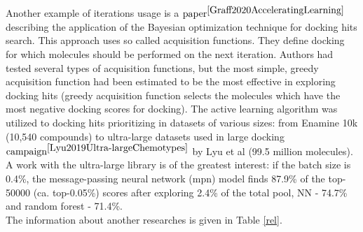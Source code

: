 Another example of iterations usage is a $\text{paper}^{\cite{Graff2020AcceleratingLearning}}$ 
describing the application of the Bayesian optimization technique for docking hits 
search.
This approach uses so called acquisition functions.
They define docking for which molecules should be performed on the next iteration.
Authors had tested several types of acquisition functions, but the most simple, 
greedy acquisition function had been estimated to be the most effective in exploring 
docking hits
(greedy acquisition function selects the molecules which have the most negative 
docking scores for docking).
The active learning algorithm was utilized to docking hits prioritizing in datasets 
of various sizes: from Enamine 10k (10,540 compounds) to ultra-large datasets used 
in large docking $\text{campaign}^{\cite{Lyu2019Ultra-largeChemotypes}}$ by Lyu 
et al (99.5 million molecules).
A work with the ultra-large library is of the greatest interest: if the batch size 
is 0.4\%, the message-passing neural network (\acrshort{mpn}) model finds 87.9\% 
of the top-50000 (ca. top-0.05\%) scores after exploring 2.4\% of the total pool, 
NN - 74.7\% and random forest - 71.4\%.\\

The information about another researches is given in Table \ref{rel}.

